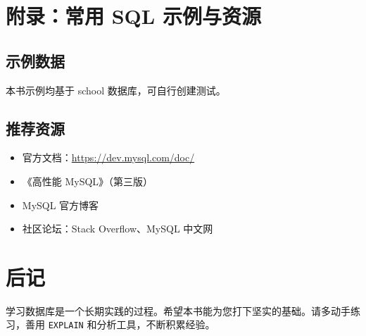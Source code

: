 \documentclass[12pt,UTF8]{ctexbook}
\begin{document}
\backmatter

\chapter{附录：常用 SQL 示例与资源}

\section{示例数据}

本书示例均基于 school 数据库，可自行创建测试。

\section{推荐资源}

\begin{itemize}
  \item 官方文档：\url{https://dev.mysql.com/doc/}
  \item 《高性能 MySQL》（第三版）
  \item MySQL 官方博客
  \item 社区论坛：Stack Overflow、MySQL 中文网
\end{itemize}

\chapter{后记}

学习数据库是一个长期实践的过程。希望本书能为您打下坚实的基础。请多动手练习，善用 \texttt{EXPLAIN} 和分析工具，不断积累经验。
\end{document}
